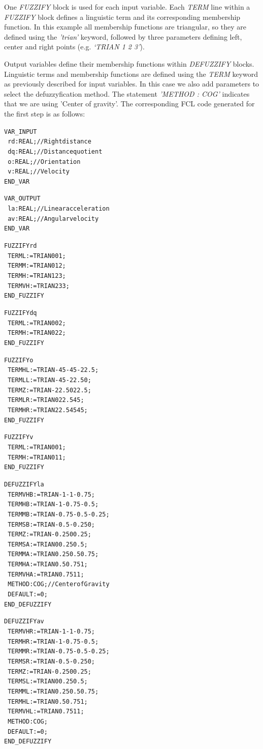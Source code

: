 \documentclass[11pt,twoside]{article}
\begin{document}
\begin{multicols}{2}
One \textit{FUZZIFY} block is used for each input variable. 
Each \textit{TERM} line within a \textit{FUZZIFY} block defines a linguistic term and its corresponding membership function.
In this example all membership functions are triangular, so they are defined using the \textit{'trian'} keyword, followed by three parameters defining left, center and right points (e.g. \textit{`TRIAN 1 2 3'}).

Output variables define their membership functions within \textit{DEFUZZIFY} blocks. 
Linguistic terms and membership functions are defined using the \textit{TERM} keyword as previously described for input variables. 
In this case we also add parameters to select the defuzzyfication method. 
The statement \textit{'METHOD : COG'} indicates that we are using 'Center of gravity'. 
The corresponding FCL code generated for the first step is as follows:

\vspace*{10pt}
\begin{scriptsize}
\begin{alltt}
VAR\_INPUT
\ 	rd : REAL;			// Right distance
\ 	dq : REAL;			// Distance quotient
\ 	o  : REAL;			// Orientation
\ 	v  : REAL;			// Velocity
END\_VAR

VAR\_OUTPUT
\ 	la : REAL;			// Linear acceleration
\ 	av : REAL;			// Angular velocity
END\_VAR

FUZZIFY rd
\ 	TERM L  := TRIAN 0 0 1;
\ 	TERM M  := TRIAN 0 1 2;
\ 	TERM H  := TRIAN 1 2 3;
\ 	TERM VH := TRIAN 2 3 3;
END\_FUZZIFY

FUZZIFY dq
\ 	TERM L := TRIAN 0 0 2;
\ 	TERM H := TRIAN 0 2 2;
END\_FUZZIFY

FUZZIFY o
\ 	TERM HL := TRIAN -45 -45 -22.5;
\ 	TERM LL := TRIAN -45 -22.5 0;
\ 	TERM Z  := TRIAN -22.5 0 22.5;
\ 	TERM LR := TRIAN 0 22.5 45;
\ 	TERM HR := TRIAN 22.5 45 45;
END\_FUZZIFY

FUZZIFY v
\ 	TERM L := TRIAN 0 0 1;
\ 	TERM H := TRIAN 0 1 1;
END\_FUZZIFY

DEFUZZIFY la
\ 	TERM VHB := TRIAN -1 -1 -0.75;
\ 	TERM HB  := TRIAN -1 -0.75 -0.5;
\ 	TERM MB  := TRIAN -0.75 -0.5 -0.25;
\ 	TERM SB  := TRIAN -0.5 -0.25 0;
\ 	TERM Z   := TRIAN -0.25 0 0.25;
\ 	TERM SA  := TRIAN 0 0.25 0.5;
\ 	TERM MA  := TRIAN 0.25 0.5 0.75;
\ 	TERM HA  := TRIAN 0.5 0.75 1;
\ 	TERM VHA := TRIAN 0.75 1 1;
\ 	METHOD : COG;			// Center of Gravity
\ 	DEFAULT := 0;
END\_DEFUZZIFY

DEFUZZIFY av
\ 	TERM VHR := TRIAN -1 -1 -0.75;
\ 	TERM HR  := TRIAN -1 -0.75 -0.5;
\ 	TERM MR  := TRIAN -0.75 -0.5 -0.25;
\ 	TERM SR  := TRIAN -0.5 -0.25 0;
\ 	TERM Z   := TRIAN -0.25 0 0.25;
\ 	TERM SL  := TRIAN 0 0.25 0.5;
\ 	TERM ML  := TRIAN 0.25 0.5 0.75;
\ 	TERM HL  := TRIAN 0.5 0.75 1;
\ 	TERM VHL := TRIAN 0.75 1 1;
\ 	METHOD : COG;
\ 	DEFAULT := 0;
END\_DEFUZZIFY
\end{alltt}
\end{scriptsize}


\end{multicols}
\end{document}
